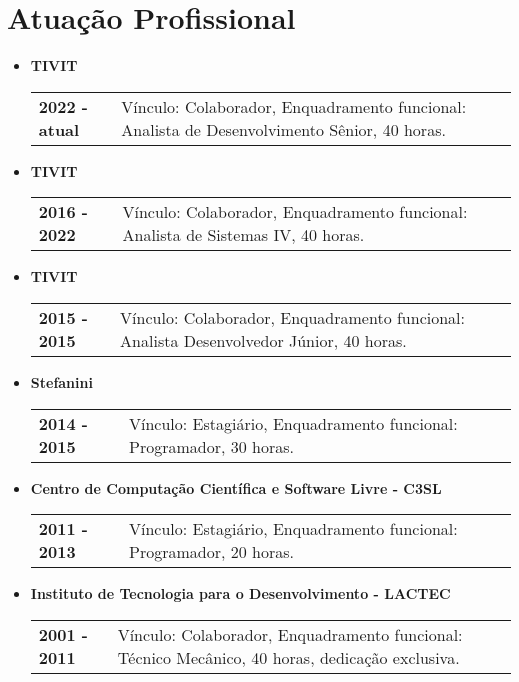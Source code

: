 \documentclass[pdftex, a4paper, 11pt]{article}
\begin{document}
\section*{Atuação Profissional}
\begin{itemize}
  \item \textbf{TIVIT}\\
  \begin{tabular}{lp{13cm}}
    \textbf{2022 - atual} & Vínculo: Colaborador, Enquadramento funcional: Analista de Desenvolvimento Sênior, 40 horas.\\
  \end{tabular}

  \item \textbf{TIVIT}\\
  \begin{tabular}{lp{13cm}}
    \textbf{2016 - 2022} & Vínculo: Colaborador, Enquadramento funcional: Analista de Sistemas IV, 40 horas.\\
  \end{tabular}

  \item \textbf{TIVIT}\\
  \begin{tabular}{lp{13cm}}
    \textbf{2015 - 2015} & Vínculo: Colaborador, Enquadramento funcional: Analista Desenvolvedor Júnior, 40 horas.\\
  \end{tabular}

\item \textbf{Stefanini}\\
  \begin{tabular}{lp{13cm}}
    \textbf{2014 - 2015} & Vínculo: Estagiário, Enquadramento funcional: Programador, 30 horas.\\
  \end{tabular}

\item \textbf{Centro de Computação Científica e Software Livre - C3SL}\\
  \begin{tabular}{lp{13cm}}
    \textbf{2011 - 2013} & Vínculo: Estagiário, Enquadramento funcional: Programador, 20 horas.\\
  \end{tabular}
  
\item \textbf{Instituto de Tecnologia para o Desenvolvimento - LACTEC}\\
  \begin{tabular}{lp{13cm}}
    \textbf{2001 - 2011} & Vínculo: Colaborador, Enquadramento funcional: Técnico Mecânico, 40 horas, dedicação exclusiva.\\
  \end{tabular}
\end{itemize}
\end{document}

